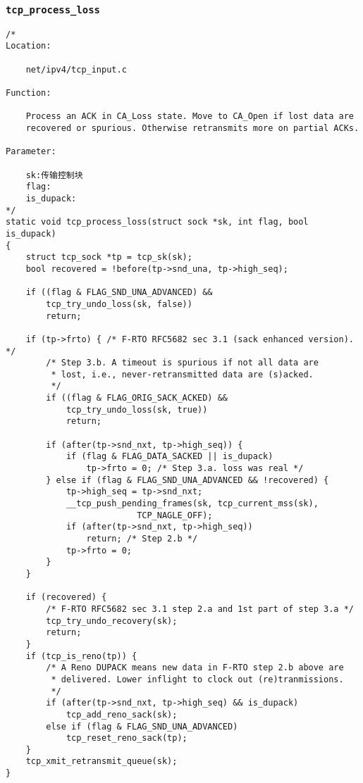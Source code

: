         \subsubsection{\texttt{tcp_process_loss}}
\begin{verbatim}
/* 
Location:

    net/ipv4/tcp_input.c

Function:

    Process an ACK in CA_Loss state. Move to CA_Open if lost data are
    recovered or spurious. Otherwise retransmits more on partial ACKs.

Parameter:

    sk:传输控制块
    flag:
    is_dupack:
*/
static void tcp_process_loss(struct sock *sk, int flag, bool is_dupack)
{
    struct tcp_sock *tp = tcp_sk(sk);
    bool recovered = !before(tp->snd_una, tp->high_seq);

    if ((flag & FLAG_SND_UNA_ADVANCED) &&
        tcp_try_undo_loss(sk, false))
        return;

    if (tp->frto) { /* F-RTO RFC5682 sec 3.1 (sack enhanced version). */
        /* Step 3.b. A timeout is spurious if not all data are
         * lost, i.e., never-retransmitted data are (s)acked.
         */
        if ((flag & FLAG_ORIG_SACK_ACKED) &&
            tcp_try_undo_loss(sk, true))
            return;

        if (after(tp->snd_nxt, tp->high_seq)) {
            if (flag & FLAG_DATA_SACKED || is_dupack)
                tp->frto = 0; /* Step 3.a. loss was real */
        } else if (flag & FLAG_SND_UNA_ADVANCED && !recovered) {
            tp->high_seq = tp->snd_nxt;
            __tcp_push_pending_frames(sk, tcp_current_mss(sk),
                          TCP_NAGLE_OFF);
            if (after(tp->snd_nxt, tp->high_seq))
                return; /* Step 2.b */
            tp->frto = 0;
        }
    }

    if (recovered) {
        /* F-RTO RFC5682 sec 3.1 step 2.a and 1st part of step 3.a */
        tcp_try_undo_recovery(sk);
        return;
    }
    if (tcp_is_reno(tp)) {
        /* A Reno DUPACK means new data in F-RTO step 2.b above are
         * delivered. Lower inflight to clock out (re)tranmissions.
         */
        if (after(tp->snd_nxt, tp->high_seq) && is_dupack)
            tcp_add_reno_sack(sk);
        else if (flag & FLAG_SND_UNA_ADVANCED)
            tcp_reset_reno_sack(tp);
    }
    tcp_xmit_retransmit_queue(sk);
}
\end{verbatim}
